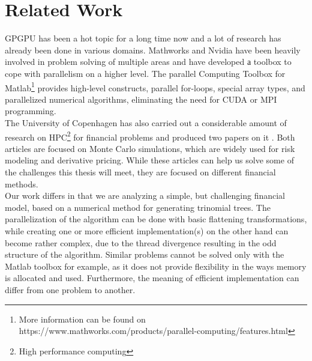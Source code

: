 \section{Related Work}
\label{section:relatedwork}
GPGPU has been a hot topic for a long time now and a lot of research has already been done in various domains. Mathworks and Nvidia have been heavily involved in problem solving of multiple areas and have developed а toolbox to cope with parallelism on a higher level. The parallel Computing Toolbox for Matlab\footnote{More information can be found on https://www.mathworks.com/products/parallel-computing/features.html} provides high-level constructs, parallel for-loops, special array types, and parallelized numerical algorithms, eliminating the need for CUDA or MPI programming. \\
The University of Copenhagen has also carried out a considerable amount of research on HPC\footnote{High performance computing} for financial problems and produced two papers on it\cite{FinPar:TACO} \cite{LexiFiPricing}. Both articles are focused on Monte Carlo simulations, which are widely used for risk modeling and derivative pricing. While these articles can help us solve some of the challenges this thesis will meet, they are focused on different financial methods.\\
Our work differs in that we are analyzing a simple, but challenging financial model, based on a numerical method for generating trinomial trees. The parallelization of the algorithm can be done with basic flattening transformations, while creating one or more efficient implementation(s) on the other hand can become rather complex, due to the thread divergence resulting in the odd structure of the algorithm. Similar problems cannot be solved only with the Matlab toolbox for example, as it does not provide flexibility in the ways memory is allocated and used. Furthermore, the meaning of efficient implementation can differ from one problem to another. 


